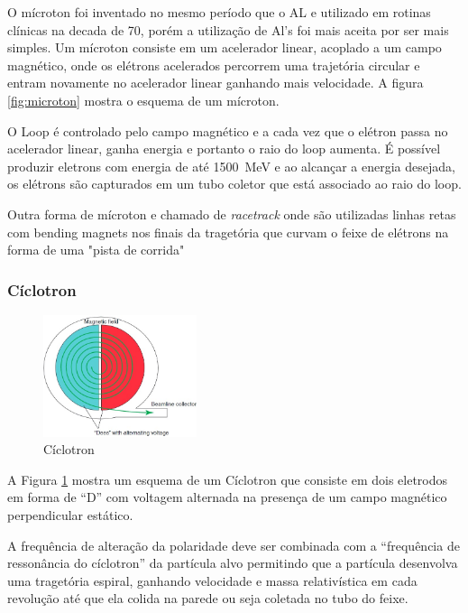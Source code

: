 \documentclass[11pt,a4paper]{article}
\begin{document}
                O mícroton foi inventado no mesmo período que o AL e utilizado em rotinas clínicas na decada de 70, porém a utilização de Al's foi mais aceita por ser mais simples. Um mícroton consiste em um acelerador linear, acoplado a um campo magnético,  onde os elétrons acelerados percorrem uma trajetória circular e entram novamente no acelerador linear ganhando mais velocidade. A figura \ref{fig:microton} mostra o esquema de um mícroton. 
                
                O Loop é controlado pelo campo magnético e a cada vez que o elétron passa no acelerador linear,  ganha energia e portanto o raio do loop aumenta.  É possível produzir eletrons com energia de até \qty{1500}{MeV} e ao alcançar a energia desejada, os elétrons são capturados em um tubo coletor que está associado ao raio do loop.


                Outra forma de mícroton e chamado de \textit{racetrack} onde são utilizadas linhas retas com bending magnets nos finais da tragetória que curvam o feixe de elétrons na forma de uma "pista de corrida"
                


            \subsubsection{Cíclotron}


            \begin{figure}
                \centering
                \includegraphics[width=0.4\textwidth]{Imagens/ciclotron.jpg}
                \caption{Cíclotron}
                \label{fig:ciclotron}
            \end{figure}


                A Figura \ref{fig:ciclotron} mostra um esquema de um Cíclotron que consiste em dois eletrodos em forma de ``D'' com voltagem alternada na presença de um campo magnético perpendicular estático.

                A frequência de alteração da polaridade deve ser combinada com a ``frequência de ressonância do cíclotron'' da partícula alvo permitindo que a partícula desenvolva uma tragetória espiral, ganhando velocidade e massa relativística em cada revolução até que ela colida na parede ou seja coletada no tubo do feixe. 
\end{document}
